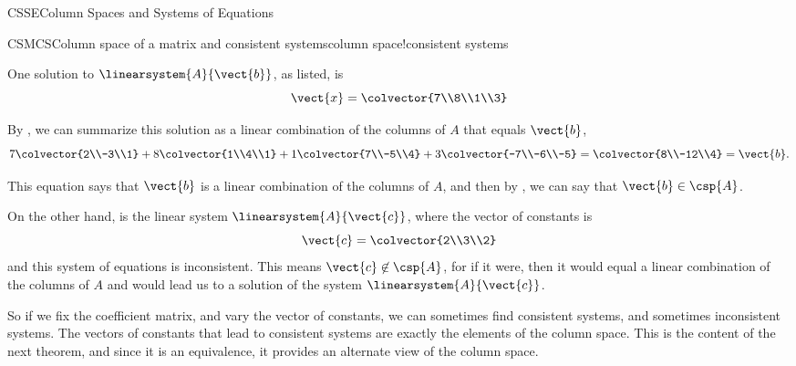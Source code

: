 \begin{subsect}{CSSE}{Column Spaces and Systems of Equations}
\begin{example}{CSMCS}{Column space of a matrix and consistent systems}{column space!consistent systems}
\begin{para}
\begin{equation*}
\end{equation*}
%
One solution to $\linearsystem{A}{\vect{b}}$, as listed, is
%
\begin{equation*}
\vect{x}=\colvector{7\\8\\1\\3}
\end{equation*}
\end{para}
%
\begin{para}By , we can summarize this solution as a linear combination of the columns of $A$ that equals $\vect{b}$,
%
\begin{equation*}
7\colvector{2\\-3\\1}+
8\colvector{1\\4\\1}+
1\colvector{7\\-5\\4}+
3\colvector{-7\\-6\\-5}=
\colvector{8\\-12\\4}=\vect{b}.
\end{equation*}
\end{para}
%
\begin{para}This equation says that $\vect{b}$ is a linear combination of the columns of $A$, and then by , we can say that $\vect{b}\in\csp{A}$.\end{para}
%
\begin{para}On the other hand,  is the linear system $\linearsystem{A}{\vect{c}}$, where the vector of constants is
%
\begin{equation*}
\vect{c}=\colvector{2\\3\\2}
\end{equation*}
%
and this system of equations is inconsistent.  This means $\vect{c}\not\in\csp{A}$, for if it were, then it would equal a linear combination of the columns of $A$ and  would lead us to a solution of the system $\linearsystem{A}{\vect{c}}$.
\end{para}
%
\end{example}
%
\begin{para}So if we fix the coefficient matrix, and vary the vector of constants, we can sometimes find consistent systems, and sometimes inconsistent systems.  The vectors of constants that lead to consistent systems are exactly the elements of the column space.  This is the content of the next theorem, and since it is an equivalence, it provides an alternate view of the column space.\end{para}

\end{subsect}
